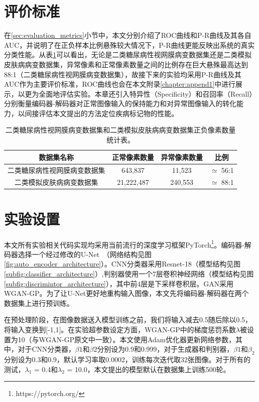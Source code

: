 \section{评价标准}\label{sec:exper_evaluation_metrics}
在\ref{sec:evaluation_metrics}小节中，本文分别介绍了ROC曲线和P-R曲线及其各自AUC，并说明了在正负样本比例悬殊较大情况下，P-R曲线更能反映出系统的真实分类性能。从表\ref{tab:bin_ds_pixel_freqs}可以看出，无论是二类糖尿病性视网膜病变数据集还是二类模拟皮肤病病变数据集，异常像素和正常像素数量之间的比例存在巨大悬殊最高达到88:1（二类糖尿病性视网膜病变数据集），故接下来的实验均采用P-R曲线及其AUC作为主要评价标准，ROC曲线也会在本文附录\ref{chapter:append1}中进行展示，以更为全面地评估实验。本章还引入特异性（Specificity）和召回率（Recall）分别衡量编码器-解码器对正常图像输入的保持能力和对异常图像输入的转化能力，以间接评估本文提出的方法定位疾病标记物的性能。
\begin{table}[h]
	\centering
	\caption[本章实验数据集正负像素数量统计表]{二类糖尿病性视网膜病变数据集和二类模拟皮肤病病变数据集正负像素数量统计表。}
	\label{tab:bin_ds_pixel_freqs}
	\begin{tabular}{c|c|c|c}
		\toprule[2pt]
		数据集名称 & 正常像素数量 & 异常像素数量 & 比例 \\
		\midrule[2pt]
		二类糖尿病性视网膜病变数据集&  643,837 & 11,523 & $\simeq$ 56:1 \\ \hline
		二类模拟皮肤病病变数据集 & 21,222,487 & 240,553 & $\simeq$ 88:1 \\
		\bottomrule[2pt]
	\end{tabular}
\end{table}
\section{实验设置}\label{sec:exper_setting}
本文所有实验相关代码实现均采用当前流行的深度学习框架PyTorch\footnote{https://pytorch.org/}。编码器-解码器选择一个经过修改的U-Net~\cite{iglovikov2018ternausnet}（网络结构见图\ref{fig:auto_encoder_architecture}）。CNN分类器采用Resnet-18（模型结构见图\ref{subfig:classifier_architecture}）,判别器使用一个7层卷积神经网络（模型结构见图\ref{subfig:discrimintor_architecture}），其中前4层是下采样卷积层。GAN采用WGAN-GP。为了让U-Net更好地重构输入图像，本文先将编码器-解码器在两个数据集上进行预训练。

在预处理阶段，在图像数据送入模型训练之前，我们将输入减去0.5随后除以0.5，将输入变换到[-1,1]。在实验超参数设定方面，WGAN-GP中的梯度惩罚系数$\lambda$被设置为10（与WGAN-GP原文中一致）。本文使用Adam优化器更新网络参数，其中，对于CNN分类器，$\beta1$和$\beta2$分别设为0.9和0.999，对于生成器和判别器，$\beta1$和$\beta_2$分别设为0.3和0.9，默认学习率取0.0002，训练每次迭代取32张图像。对于所有的测试，$\lambda_1$ = 0.4和$\lambda_{2}$ = 10.0，本文提出的模型默认在数据集上训练500轮。

